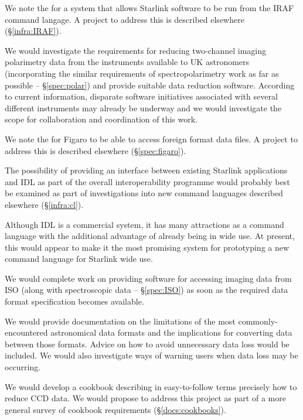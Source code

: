 {We note the  for
a system that allows Starlink software to be run from the IRAF command
langage. A project to address this is described elsewhere
(\S\ref{infra:IRAF}).}

{We would investigate the requirements for reducing two-channel
imaging polarimetry data from the instruments available to UK
astronomers (incorporating the similar requirements of
spectropolarimetry work as far as possible -- \S\ref{spec:polar}) and
provide suitable data reduction software. According to current
information, disparate software initiatives associated with several
different instruments may already be underway and we would investigate
the scope for collaboration and coordination of this work.}

{We note the 
for Figaro to be able to access foreign format data files. A project
to address this is described elsewhere (\S\ref{spec:figaro}).}

{The possibility of providing an interface between existing Starlink
applications and IDL as part of the overall interoperability programme
would probably best be examined as part of investigations into new
command languages described elsewhere (\S\ref{infra:cl}).

Although IDL is a commercial system, it has many attractions as a
command language with the additional advantage of already being in
wide use. At present, this would appear to make it the most promising
system for prototyping a new command language for Starlink wide use.}

{We would complete work on providing software for accessing imaging
data from ISO (along with spectroscopic data -- \S\ref{spec:ISO}) as
soon as the required data format specification becomes available.}

{We would provide documentation on the limitations of the most
commonly-encountered astronomical data formats and the implications
for converting data between those formats. Advice on how to avoid
unnecessary data loss would be included. We would also investigate
ways of warning users when data loss may be occurring.}

{We would develop a cookbook describing in easy-to-follow terms
precisely how to reduce CCD data. We would propose to address this
project as part of a more general survey of cookbook requirements
(\S\ref{docs:cookbooks}).}

